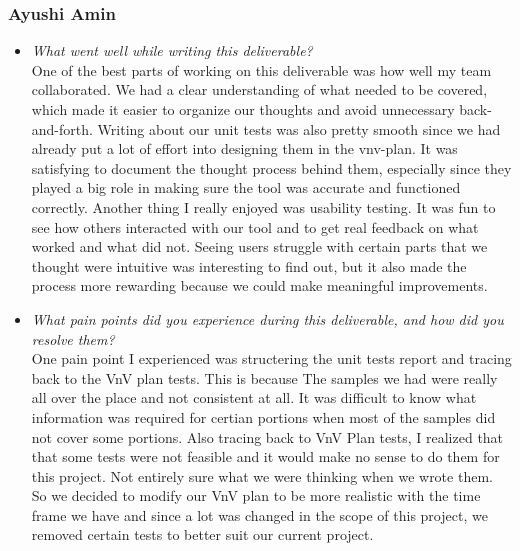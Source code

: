 \documentclass[12pt, titlepage]{article}
\begin{document}
\subsubsection*{Ayushi Amin}
\begin{itemize}
  \item \textit{What went well while writing this deliverable?} \\

    One of the best parts of working on this deliverable was how well
    my team collaborated. We had a clear understanding of what needed
    to be covered, which made it easier to organize our thoughts and
    avoid unnecessary back-and-forth. Writing about our unit tests
    was also pretty smooth since we had already put a lot of effort
    into designing them in the vnv-plan.
    It was satisfying to document the thought process behind them,
    especially since they played a big role in making sure the tool
    was accurate and functioned correctly.
    Another thing I really enjoyed was usability testing. It was fun
    to see how others interacted with our tool and to get real
    feedback on what worked and what did not. Seeing users struggle
    with certain parts that we thought were intuitive was interesting
    to find out, but it also made the process more rewarding because
    we could make meaningful improvements.

  \item \textit{What pain points did you experience during this
    deliverable, and how did you resolve them?}\\

    One pain point I experienced was structering the unit tests
    report and tracing back to the VnV plan tests. This is because
    The samples we had were really all over the place and not consistent at all.
    It was difficult to know what information was required for
    certian portions when most of the samples did not cover some
    portions. Also tracing back to VnV Plan tests, I realized that
    that some tests were not
    feasible and it would make no sense to do them for this project.
    Not entirely sure what we were thinking when we wrote them. So we
    decided to modify our VnV plan to be more realistic with the time
    frame we have
    and since a lot was changed in the scope of this project, we
    removed certain tests to better suit our current project.

\end{itemize}
\end{document}
